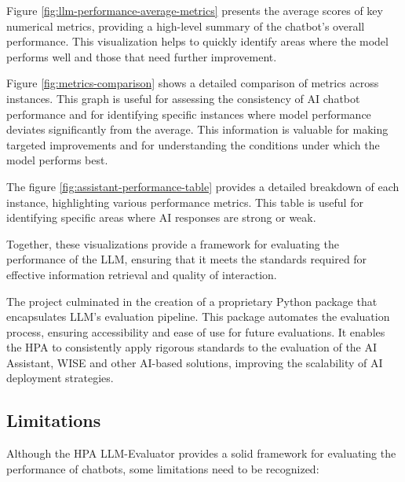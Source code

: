 Figure \ref{fig:llm-performance-average-metrics} presents the average scores of key numerical metrics, providing a high-level summary of the chatbot's overall performance. This visualization helps to quickly identify areas where the model performs well and those that need further improvement.

Figure \ref{fig:metrics-comparison} shows a detailed comparison of metrics across instances. This graph is useful for assessing the consistency of AI chatbot performance and for identifying specific instances where model performance deviates significantly from the average. This information is valuable for making targeted improvements and for understanding the conditions under which the model performs best.

The figure \ref{fig:assistant-performance-table} provides a detailed breakdown of each instance, highlighting various performance metrics. This table is useful for identifying specific areas where AI responses are strong or weak.

Together, these visualizations provide a framework for evaluating the performance of the LLM, ensuring that it meets the standards required for effective information retrieval and quality of interaction.

The project culminated in the creation of a proprietary Python package that encapsulates LLM's evaluation pipeline. This package automates the evaluation process, ensuring accessibility and ease of use for future evaluations. It enables the HPA to consistently apply rigorous standards to the evaluation of the AI Assistant, WISE and other AI-based solutions, improving the scalability of AI deployment strategies.

\subsection{Limitations}

Although the HPA LLM-Evaluator provides a solid framework for evaluating the performance of chatbots, some limitations need to be recognized:

